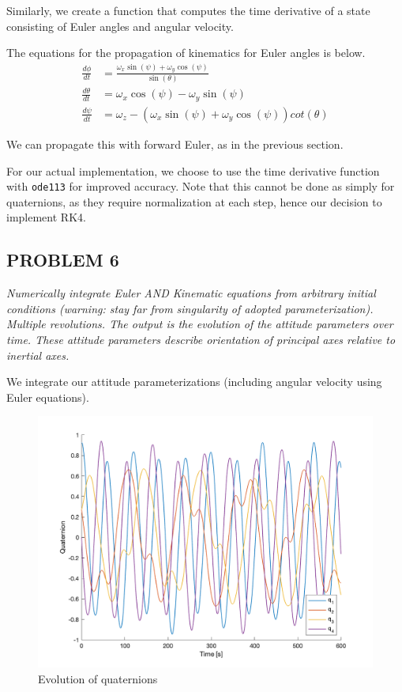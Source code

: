 Similarly, we create a function that computes the time derivative of a state consisting of Euler angles and angular velocity.

The equations for the propagation of kinematics for Euler angles is below.
\begin{align*}
\frac{d \phi}{dt} &= \frac{\omega_{x} \sin(\psi) + \omega_{y} \cos(\psi)}{\sin(\theta)}\\
\frac{d \theta}{dt} &= \omega_{x} \cos(\psi) - \omega_{y} \sin(\psi)\\
\frac{d \psi}{dt} &= \omega_{z} - (\omega_{x} \sin(\psi) + \omega_{y} \cos(\psi)) cot(\theta)
\end{align*}



We can propagate this with forward Euler, as in the previous section.



For our actual implementation, we choose to use the time derivative function with \texttt{ode113} for improved accuracy. Note that this cannot be done as simply for quaternions, as they require normalization at each step, hence our decision to implement RK4.


\subsection{PROBLEM 6}
\textit{Numerically integrate Euler AND Kinematic equations from arbitrary initial conditions (warning: stay far from singularity of adopted parameterization). Multiple revolutions. The output is the evolution of the attitude parameters over time. These attitude parameters describe orientation of principal axes relative to inertial axes.}

We integrate our attitude parameterizations (including angular velocity using Euler equations).

\begin{figure}[H]
\centering
\includegraphics[scale=0.6]{Images/ps3_problem6_quaternions.png}
\caption{Evolution of quaternions}
\label{fig:ps3_problem6_quaternions}
\end{figure}

